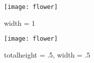 \documentclass[a4paper,12pt]{report}
\begin{document}
\begin{figure}[htb]
\caption{width = 1}
\begin{center}
\texttt{[image: flower]}
\end{center}
\end{figure}
\clearpage

\begin{figure}[htb]
\caption{totalheight = .5, width = .5}
\begin{center}
\texttt{[image: flower]}
\end{center}
\end{figure}
\clearpage
\end{document}
